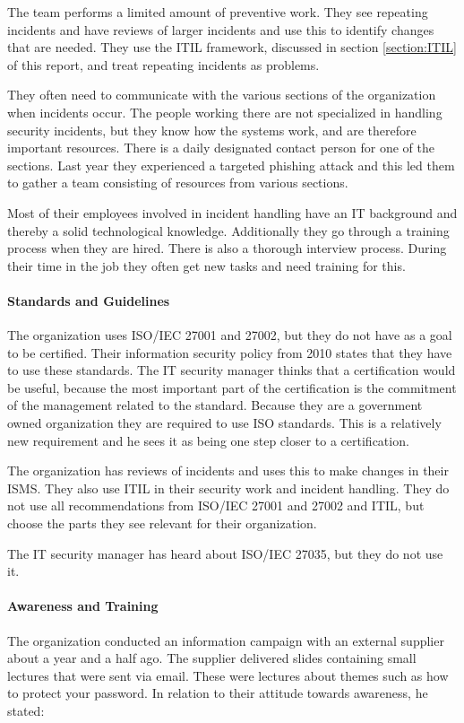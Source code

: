 The team performs a limited amount of preventive work. They see repeating incidents and have reviews of larger incidents and use this to identify changes that are needed. They use the \ac{ITIL} framework, discussed in section \ref{section:ITIL} of this report, and treat repeating incidents as problems.

They often need to communicate with the various sections of the organization when incidents occur. The people working there are not specialized in handling security incidents, but they know how the systems work, and are therefore important resources. There is a daily designated contact person for one of the sections. Last year they experienced a targeted phishing attack and this led them to gather a team consisting of resources from various sections.

Most of their employees involved in incident handling have an IT background and thereby a solid technological knowledge. Additionally they go through a training process when they are hired. There is also a thorough interview process. During their time in the job they often get new tasks and need training for this. 

\paragraph{Standards and Guidelines}
The organization uses \acs{ISO}/\acs{IEC} 27001 and 27002, but they do not have as a goal to be certified. Their information security policy from 2010 states that they have to use these standards. The IT security manager thinks that a certification would be useful, because the most important part of the certification is the commitment of the management related to the standard. Because they are a government owned organization they are required to use \acs{ISO} standards. This is a relatively new requirement and he sees it as being one step closer to a certification.

The organization has reviews of incidents and uses this to make changes in their \ac{ISMS}. They also use \ac{ITIL} in their security work and incident handling. They do not use all recommendations from \acs{ISO}/\acs{IEC} 27001 and 27002 and \ac{ITIL}, but choose the parts they see relevant for their organization.

The IT security manager has heard about \acs{ISO}/\acs{IEC} 27035, but they do not use it.

\paragraph{Awareness and Training}
The organization conducted an information campaign with an external supplier about a year and a half ago. The supplier delivered slides containing small lectures that were sent via email. These were lectures about themes such as how to protect your password. In relation to their attitude towards awareness, he stated: 

